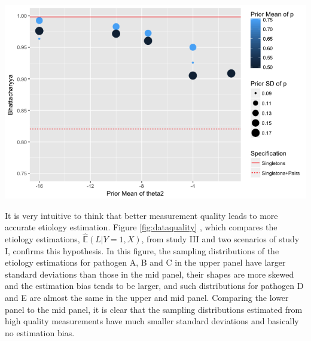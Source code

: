 \documentclass[11 pt, a4paper]{article}  %
\begin{document}
\begin{center}
\includegraphics[scale=0.6]{StudyII.png}
\label{fig:study2}
\end{center}



It is very intuitive to think that better measurement quality leads to more accurate etiology estimation. Figure \ref{fig:dataquality} , which compares the etiology estimations, $\hat{\mathbb{E}}(L|Y=1,X)$, from study III and two scenarios of study I, confirms this hypothesis. In this figure, the sampling distributions of the etiology estimations for pathogen A, B and C in the upper panel have larger standard deviations than those in the mid panel, their shapes are more skewed and the estimation bias tends to be larger, and such distributions for pathogen D and E are almost the same in the upper and mid panel. Comparing the lower panel to the mid panel, it is clear that the sampling distributions estimated from high quality measurements have much smaller standard deviations and basically no estimation bias.\\
\end{document}
